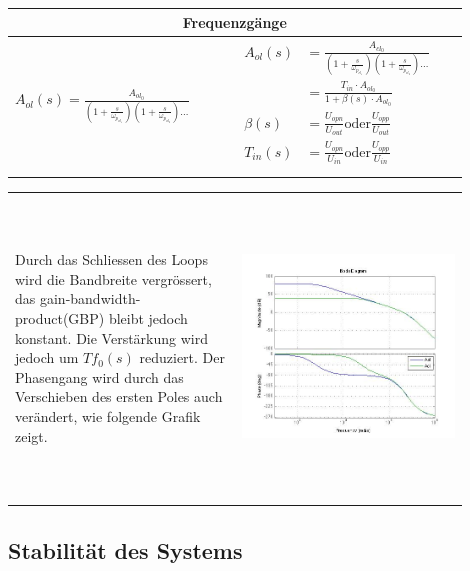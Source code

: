 \begin{tabular}{|p{0.45\linewidth}|p{0.45\linewidth}|}
	\hline
	\multicolumn{2}{|c|}{\textbf{Frequenzgänge}}\\
	\hline
	\large{$A_{ol}(s)=\frac{A_{ol_0}}{(1+\frac{s}{\omega_{p_{ol_1}}})(1+\frac{s}{\omega_{p_{ol_2}}})\dots}$}
		& $\begin{aligned} A_{ol}(s) &= \frac{A_{cl_0}}{(1+\frac{s}{\omega_{p_{cl_1}}})(1+\frac{s}{\omega_{p_{cl_2}}})\dots} \\
											  &= \frac{T_{in}\cdot A_{ol_0}}{1+\beta(s)\cdot A_{ol_0}}\\
									 \beta(s) &= \frac{U_{opn}}{U_{out}}\text{oder}\frac{U_{opp}}{U_{out}}\\
									 T_{in}(s) &= \frac{U_{opn}}{U_{in}}\text{oder}\frac{U_{opp}}{U_{in}}\\
								\end{aligned}$\\
	\hline
\end{tabular}

\begin{tabular}{p{0.45\linewidth}p{0.45\linewidth}}
	Durch das Schliessen des Loops wird die Bandbreite vergrössert, das gain-bandwidth-product(GBP) bleibt jedoch konstant. Die Verstärkung wird jedoch um $Tf_0(s)$ reduziert. Der Phasengang wird durch das Verschieben des ersten Poles auch verändert, wie folgende Grafik zeigt.
		& 	\begin{minipage}{0.4\linewidth}
				\includegraphics[height=8cm, width=10cm]{./pictures/AolAcl.jpg}
			\end{minipage}
\end{tabular}

\subsection{Stabilität des Systems}

